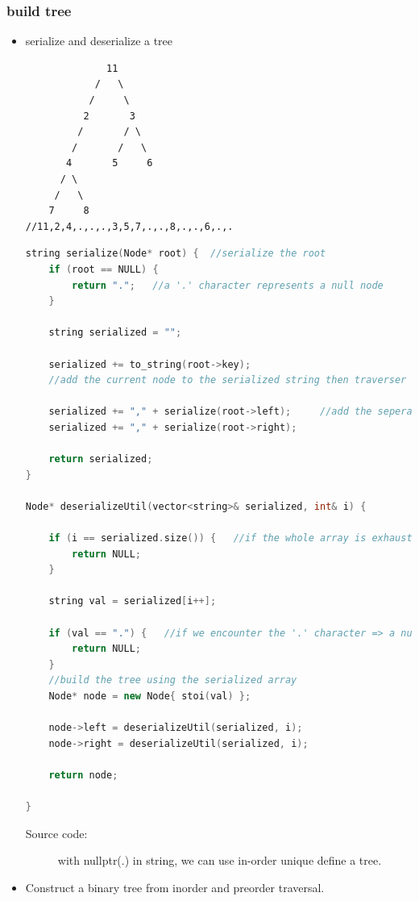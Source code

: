 \documentclass[a4paper,11pt,twoside]{book}
\begin{document}
\subsubsection{build tree}
\begin{itemize}
	
	\item serialize and deserialize a tree
	
\begin{lstlisting}
              11
            /   \
           /     \
          2       3
         /       / \
        /       /   \
       4       5     6
      / \
     /   \
    7     8
//11,2,4,.,.,.,3,5,7,.,.,8,.,.,6,.,.
\end{lstlisting}

\begin{lstlisting}[frame=single, language=c++]
string serialize(Node* root) {  //serialize the root
	if (root == NULL) {
		return ".";   //a '.' character represents a null node
	}
	
	string serialized = "";
	
	serialized += to_string(root->key);  
	//add the current node to the serialized string then traverser its left and right children respectively
	
	serialized += "," + serialize(root->left);     //add the seperator after each node
	serialized += "," + serialize(root->right);
	
	return serialized;
}

Node* deserializeUtil(vector<string>& serialized, int& i) {
	
	if (i == serialized.size()) {   //if the whole array is exhausted
		return NULL;
	}
	
	string val = serialized[i++];
	
	if (val == ".") {   //if we encounter the '.' character => a null pointer
		return NULL;
	}
	//build the tree using the serialized array
	Node* node = new Node{ stoi(val) };
	
	node->left = deserializeUtil(serialized, i);
	node->right = deserializeUtil(serialized, i);
	
	return node;
	
}
\end{lstlisting}
\begin{description}
\item[Source code:] with nullptr(.) in string, we can use in-order unique define a tree.
\end{description}
	
	
	\item Construct a binary tree from inorder and preorder traversal.
	

\end{itemize}
\end{document}
